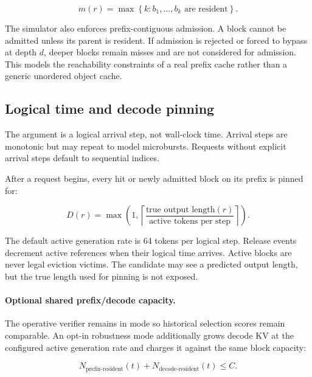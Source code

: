\documentclass[11pt]{article}
\newcommand{\code}[1]{\texttt{\detokenize{#1}}}
\begin{document}
\begin{equation}
  m(r) = \max\left\{k:
  b_1,\ldots,b_k \text{ are resident}\right\}.
\end{equation}

The simulator also enforces prefix-contiguous admission.  A block cannot be admitted
unless its parent is resident.  If admission is rejected or forced to bypass at depth
\(d\), deeper blocks remain misses and are not considered for admission.  This models
the reachability constraints of a real prefix cache rather than a generic unordered
object cache.

\subsection{Logical time and decode pinning}

The \code{now} argument is a logical arrival step, not wall-clock time.  Arrival steps
are monotonic but may repeat to model microbursts.  Requests without explicit arrival
steps default to sequential indices.

After a request begins, every hit or newly admitted block on its prefix is pinned for:

\begin{equation}
  D(r) = \max\left(1,
    \left\lceil\frac{\text{true output length}(r)}
                         {\text{active tokens per step}}\right\rceil
  \right).
\end{equation}

The default active generation rate is 64 tokens per logical step.  Release events
decrement active references when their logical time arrives.  Active blocks are never
legal eviction victims.  The candidate may see a predicted output length, but the true
length used for pinning is not exposed.

\paragraph{Optional shared prefix/decode capacity.}
The operative verifier remains in \code{prefix\_only} mode so historical selection
scores remain comparable.  An opt-in \code{shared} robustness mode additionally grows
decode KV at the configured active generation rate and charges it against the same
block capacity:

\begin{equation}
  N_{\text{prefix-resident}}(t) + N_{\text{decode-resident}}(t) \le C.
\end{equation}
\end{document}
